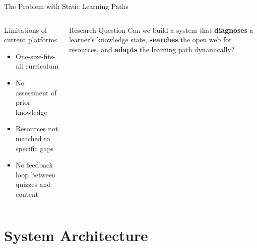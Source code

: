 \documentclass[aspectratio=169,12pt]{beamer}
\begin{document}
\begin{frame}{The Problem with Static Learning Paths}
  \begin{columns}
      \begin{block}{Limitations of current platforms}
        \begin{itemize}
          \item One-size-fits-all curriculum
          \item No assessment of prior knowledge
          \item Resources not matched to specific gaps
          \item No feedback loop between quizzes and content
        \end{itemize}
      \end{block}
      \vspace{6pt}
      \begin{alertblock}{Research Question}
        Can we build a system that \textbf{diagnoses} a learner's
        knowledge state, \textbf{searches} the open web for resources,
        and \textbf{adapts} the learning path dynamically?
      \end{alertblock}
  \end{columns}
\end{frame}

\section{System Architecture}
\end{document}

